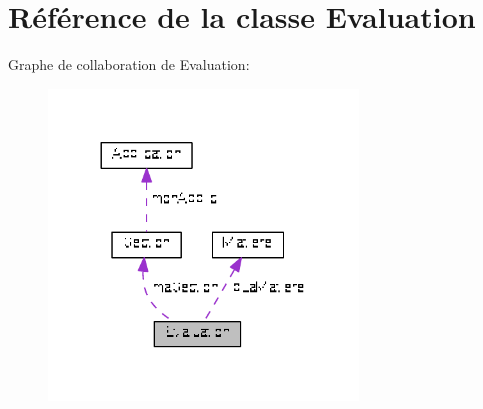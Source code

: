 \hypertarget{class_evaluation}{\section{Référence de la classe Evaluation}
\label{class_evaluation}
}


Graphe de collaboration de Evaluation\+:\nopagebreak
\begin{figure}[H]
\begin{center}
\leavevmode
\includegraphics[width=233pt]{class_evaluation__coll__graph}
\end{center}
\end{figure}
